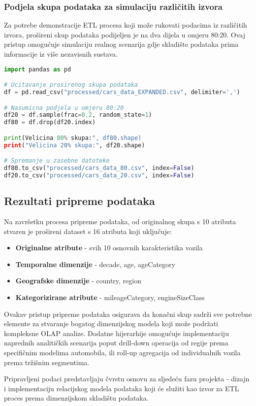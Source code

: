 \subsubsection{Podjela skupa podataka za simulaciju različitih izvora}

Za potrebe demonstracije ETL procesa koji može rukovati podacima iz različitih izvora, prošireni skup podataka podijeljen je na dva dijela u omjeru 80:20. Ovaj pristup omogućuje simulaciju realnog scenarija gdje skladište podataka prima informacije iz više nezavisnih sustava.

\begin{lstlisting}[language=Python, caption={Podjela skupa podataka na dva dijela}, inputencoding=utf8]
import pandas as pd

# Ucitavanje prosirenog skupa podataka
df = pd.read_csv("processed/cars_data_EXPANDED.csv", delimiter=',')

# Nasumicna podjela u omjeru 80:20
df20 = df.sample(frac=0.2, random_state=1)
df80 = df.drop(df20.index)

print(Velicina 80% skupa:", df80.shape)
print("Velicina 20% skupa:", df20.shape)

# Spremanje u zasebne datoteke
df80.to_csv("processed/cars_data_80.csv", index=False)
df20.to_csv("processed/cars_data_20.csv", index=False)
\end{lstlisting}

\subsection{Rezultati pripreme podataka}

Na završetku procesa pripreme podataka, od originalnog skupa s 10 atributa stvaren je prošireni dataset s 16 atributa koji uključuje:

\begin{itemize}
    \item \textbf{Originalne atribute} - svih 10 osnovnih karakteristika vozila
    \item \textbf{Temporalne dimenzije} - decade, age, ageCategory
    \item \textbf{Geografske dimenzije} - country, region
    \item \textbf{Kategorizirane atribute} - mileageCategory, engineSizeClass
\end{itemize}

Ovakav pristup pripreme podataka osigurava da konačni skup sadrži sve potrebne elemente za stvaranje bogatog dimenzijskog modela koji može podržati kompleksne OLAP analize. Dodatne hijerarhije omogućuje implementaciju naprednih analitičkih scenarija poput drill-down operacija od regije prema specifičnim modelima automobila, ili roll-up agregacija od individualnih vozila prema tržišnim segmentima.

Pripravljeni podaci predstavljaju čvrstu osnovu za sljedeću fazu projekta - dizajn i implementaciju relacijskog modela podataka koji će služiti kao izvor za ETL proces prema dimenzijskom skladištu podataka.